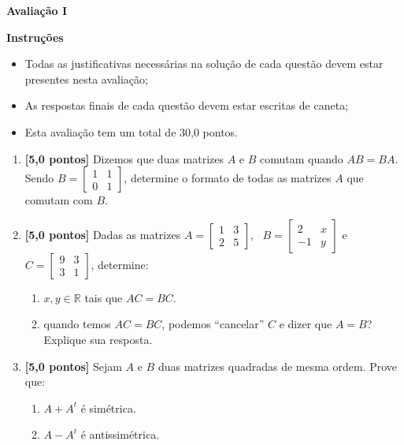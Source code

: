 \documentclass[12pt,a4paper]{article}
\begin{document}
\begin{center}
 \textbf{Avaliação I}
\end{center}

\textbf{Instruções}
\begin{itemize}
 \item Todas as justificativas necessárias na solução de cada questão devem estar presentes nesta avaliação;
 \item As respostas finais de cada questão devem estar escritas de caneta;
 \item Esta avaliação tem um total de 30,0 pontos.
\end{itemize}

\begin{enumerate}
  \item \textbf{[5,0 pontos]} Dizemos que duas matrizes $A$ e $B$ comutam quando $AB=BA$. Sendo
    $B=\left[\begin{array}{rr}
      1 & 1\\
      0 & 1
    \end{array}\right]$, determine o formato de todas as matrizes $A$ que comutam com $B$.

  \item \textbf{[5,0 pontos]} Dadas as matrizes
    $A=
      \begin{bmatrix}
        1 & 3 \\
        2 & 5
      \end{bmatrix},
      \ \ \ 
    B=\begin{bmatrix}
      2 & x \\
      -1 & y
    \end{bmatrix}$ e 
    $C=\begin{bmatrix}
      9 & 3 \\
      3 & 1
    \end{bmatrix}$, determine:

    \begin{enumerate}
      \item $x , y \in\mathbb{R}$ tais que $AC=BC$.
     \item quando temos $AC=BC$, podemos ``cancelar'' $C$ e dizer que $A=B$? Explique sua resposta.
    \end{enumerate}

  \item \textbf{[5,0 pontos]} Sejam $A$ e $B$ duas matrizes quadradas de mesma ordem. Prove que:
    \begin{enumerate}
      \item $A + A^t$ é simétrica.
      \item $A - A^t$ é antissimétrica.
    \end{enumerate}


\end{enumerate}
\end{document}
